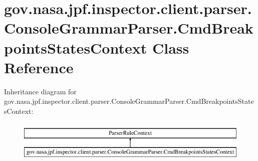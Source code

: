 \hypertarget{classgov_1_1nasa_1_1jpf_1_1inspector_1_1client_1_1parser_1_1_console_grammar_parser_1_1_cmd_breakpoints_states_context}{}\section{gov.\+nasa.\+jpf.\+inspector.\+client.\+parser.\+Console\+Grammar\+Parser.\+Cmd\+Breakpoints\+States\+Context Class Reference}
\label{classgov_1_1nasa_1_1jpf_1_1inspector_1_1client_1_1parser_1_1_console_grammar_parser_1_1_cmd_breakpoints_states_context}
Inheritance diagram for gov.\+nasa.\+jpf.\+inspector.\+client.\+parser.\+Console\+Grammar\+Parser.\+Cmd\+Breakpoints\+States\+Context\+:\begin{figure}[H]
\begin{center}
\leavevmode
\includegraphics[height=2.000000cm]{classgov_1_1nasa_1_1jpf_1_1inspector_1_1client_1_1parser_1_1_console_grammar_parser_1_1_cmd_breakpoints_states_context}
\end{center}
\end{figure}
